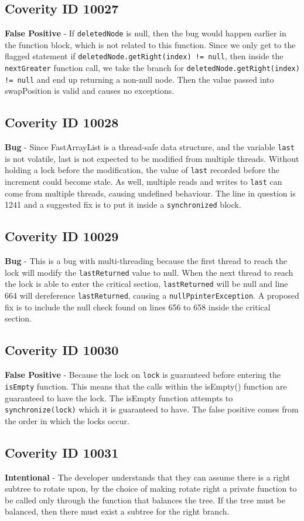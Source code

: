 \documentclass[12pt]{article}
\begin{document}
\subsection*{Coverity ID 10027}
\textbf{False Positive} - If \texttt{deletedNode} is null, then the bug would happen earlier in the function block, which is not related to this function. Since we only get to the flagged statement if \texttt{deletedNode.getRight(index) != null}, then inside the \texttt{nextGreater} function call, we take the branch for \texttt{deletedNode.getRight(index) != null} and end up returning a non-null node. Then the value passed into swapPosition is valid and causes no exceptions.
\subsection*{Coverity ID 10028}
\textbf{Bug} - Since FastArrayList is a thread-safe data structure, and the variable \texttt{last} is not volatile, last is not expected to be modified from multiple threads. Without holding a lock before the modification, the value of \texttt{last} recorded before the increment could become stale. As well, multiple reads and writes to \texttt{last} can come from multiple threads, causing undefined behaviour. The line in question is 1241 and a suggested fix is to put it inside a \texttt{synchronized} block.
\subsection*{Coverity ID 10029}
\textbf{Bug} - This is a bug with multi-threading because the first thread to reach the lock will modify the \texttt{lastReturned} value to null. When the next thread to reach the lock is able to enter the critical section, \texttt{lastReturned} will be null and line 664 will dereference \texttt{lastReturned}, causing a \texttt{nullPpinterException}. A proposed fix is to include the null check found on lines 656 to 658 inside the critical section.
\subsection*{Coverity ID 10030}
\textbf{False Positive} - Because the lock on \texttt{lock} is guaranteed before entering the \texttt{isEmpty} function. This means that the calls within the isEmpty() function are guaranteed to have the lock. The isEmpty function attempts to \texttt{synchronize(lock)} which it is guaranteed to have. The false positive comes from the order in which the locks occur.
\subsection*{Coverity ID 10031}
\textbf{Intentional} - The developer understands that they can assume there is a right subtree to rotate upon, by the choice of making rotate right a private function to be called only through the function that balances the tree. If the tree must be balanced, then there must exist a subtree for the right branch.
\end{document}
